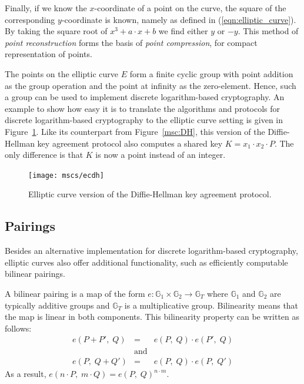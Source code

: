 Finally, if we know the $x$-coordinate of a point on the curve, the square of
the corresponding $y$-coordinate is known, namely as defined in
(\ref{eqn:elliptic_curve}). By taking the square root of $x^{3} + a \cdot x + b$ we
find either $y$ or $-y$. This method of \emph{point reconstruction} forms the
basis of \emph{point compression}, for compact representation of points.

The points on the elliptic curve $E$ form a finite cyclic group with point
addition as the group operation and the point at infinity as the zero-element.
Hence, such a group can be used to implement discrete logarithm-based
cryptography. An example to show how easy it is to translate the algorithms and
protocols for discrete logarithm-based cryptography to the elliptic curve
setting is given in Figure~\ref{msc:ECDH}. Like its counterpart from
Figure~\ref{msc:DH}, this version of the Diffie-Hellman key agreement protocol
also computes a shared key $K = x_1 \cdot x_2 \cdot P$. The only difference is
that $K$ is now a point instead of an integer.

\begin{figure}[ht]
  \centering
  \texttt{[image: mscs/ecdh]}
  \caption{Elliptic curve version of the Diffie-Hellman key agreement protocol.}
  \label{msc:ECDH}
\end{figure}

\subsection{Pairings\label{sec:pairings}}

Besides an alternative implementation for discrete logarithm-based cryptography,
elliptic curves also offer additional functionality, such as efficiently
computable bilinear pairings.

A bilinear pairing is a map of the form $e: \mathbb{G}_1 \times \mathbb{G}_2 \to
\mathbb{G}_T$ where $\mathbb{G}_1$ and $\mathbb{G}_2$ are typically additive
groups and $\mathbb G_T$ is a multiplicative group. Bilinearity means that the
map is linear in both components. This bilinearity property can be written as
follows:
\begin{equation*}
  \begin{array}{rcl}
    e(P + P',\; Q) & = & e(P,\; Q)\cdot e(P',\; Q) \\
     & \text{and} & \\
    e(P,\; Q + Q') & = & e(P,\; Q)\cdot e(P,\; Q')
  \end{array}
\end{equation*}
As a result, $e(n\cdot P,\; m\cdot Q) = e(P,\; Q)^{n \cdot m}$.

